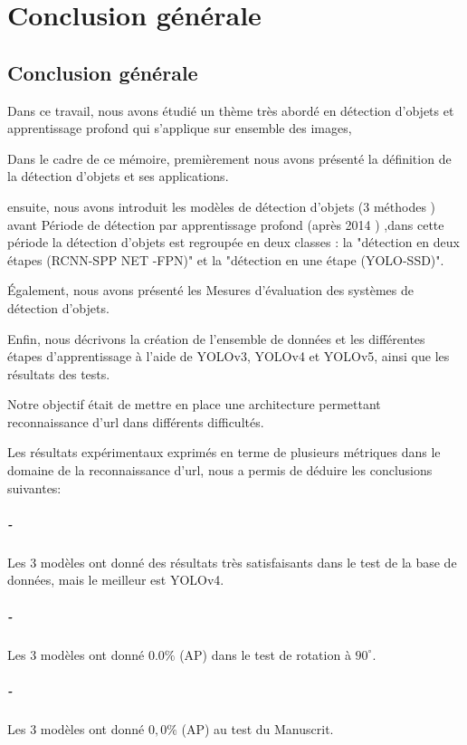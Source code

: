 \chapter*{Conclusion générale}
\pagestyle{fancy}
\fancyhead[L]{}
\renewcommand{\headrulewidth}{1pt}
\fancyfoot[C]{\thepage}
\section*{Conclusion générale}
Dans ce travail, nous avons étudié un thème très abordé en détection d'objets et apprentissage profond qui s'applique  sur ensemble des images, 

Dans le cadre de ce mémoire, premièrement nous avons présenté la  définition  de la détection  d'objets  et ses  applications.

ensuite, nous avons introduit  les modèles de détection d'objets  (3 méthodes ) avant Période de détection par apprentissage profond (après 2014 ) ,dans cette période  la détection d'objets est regroupée en deux classes : la "détection en deux étapes (RCNN-SPP NET -FPN)" et la "détection en une étape (YOLO-SSD)".

Également, nous avons présenté  les Mesures d'évaluation des systèmes de détection d'objets. 

Enfin, nous décrivons la création de l'ensemble de données et les différentes étapes d'apprentissage à l'aide de YOLOv3, YOLOv4 et YOLOv5, ainsi que les résultats des tests.

Notre objectif était de mettre en place une architecture permettant reconnaissance d’url dans différents difficultés.

Les résultats expérimentaux exprimés en terme de plusieurs métriques dans le domaine   de la reconnaissance  d’url, nous a permis de déduire les conclusions suivantes:
\paragraph{-} Les 3 modèles ont donné des résultats très satisfaisants dans le test de la base de données, mais le meilleur est YOLOv4. 
\paragraph{-} Les 3 modèles ont donné $0.0\%$ (AP) dans le test de rotation à $90^\circ$.
\paragraph{-} Les 3 modèles ont donné $0,0\%$ (AP) au test du Manuscrit.

